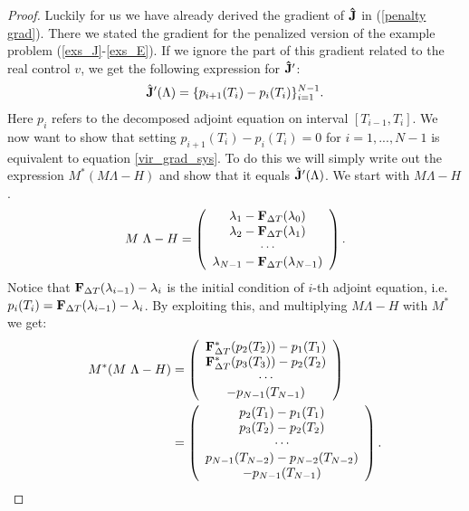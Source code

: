\begin{proof}
Luckily for us we have already derived the gradient of $\bold{\hat J}$ in (\ref{penalty grad}). There we stated the gradient for the penalized version of the example problem (\ref{exs_J}-\ref{exs_E}). If we ignore the part of this gradient related to the real control $v$, we get the following expression for $\bold{\hat J}'$:
\begin{align*}
\hat{\bold J}'(\Lambda) = \{p_{i+1}(T_i)-p_{i}(T_i)\}_{i=1}^{N-1}.
\end{align*}
Here $p_i$ refers to the decomposed adjoint equation on interval $[T_{i-1},T_{i}]$. We now want to show that setting $p_{i+1}(T_i)-p_{i}(T_i)=0$ for $i=1,...,N-1$ is equivalent to equation \ref{vir_grad_sys}. To do this we will simply write out the expression $M^*(M\Lambda-H)$ and show that it equals $\hat{\bold J}'(\Lambda)$. We start with $M\Lambda-H$.
\begin{align*}
M \ \Lambda - H  = \left( \begin{array}{c}
	\lambda_1-\bold{F}_{\Delta T}(\lambda_0)\\
	\lambda_2-\bold{F}_{\Delta T}(\lambda_1) \\
	\cdots \\
	\lambda_{N-1}-\bold{F}_{\Delta T}(\lambda_{N-1}) 
	\end{array} \right).
\end{align*}
Notice that $\bold{F}_{\Delta T}(\lambda_{i-1})-\lambda_i$ is the initial condition of $i$-th adjoint equation, i.e. $p_i(T_i)=\bold{F}_{\Delta T}(\lambda_{i-1})-\lambda_i$. By exploiting this, and multiplying $M\Lambda-H$ with $M^*$ we get:
\begin{align}
M^* (M \ \Lambda-H)&=
	\left( \begin{array}{c}
	 \bold{F}_{\Delta T}^*(p_2( T_2))-p_1(T_1)\\
	\bold{F}_{\Delta T}^*(p_3( T_3))-p_2(T_2)\\
	\cdots \\
	-p_{N-1}(T_{N-1})
	\end{array} \right)
	\\
	&=\left( \begin{array}{c}
	p_2(T_1)-p_1(T_1)\\
	p_3(T_2)-p_2(T_2)\\
	\cdots \\
	p_{N-1}(T_{N-2})-p_{N-2}(T_{N-2}) \\
	-p_{N-1}(T_{N-1})
	\end{array} \right).
\end{align}

\end{proof}
